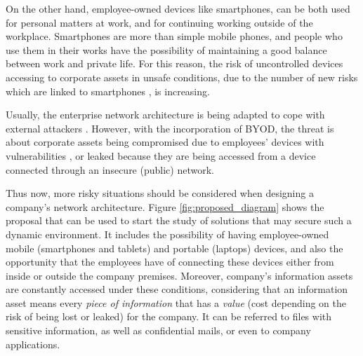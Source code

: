 On the other hand, employee-owned devices like smartphones, can be both used for personal matters at work, and for continuing working outside of the workplace. Smartphones are more than simple mobile phones, and people who use them in their works have the possibility of maintaining a good balance between work and private life. For this reason, the risk of uncontrolled devices accessing to corporate assets in unsafe conditions, due to the number of new risks which are linked to smartphones \cite{gangula2013survey}, is increasing.

Usually, the enterprise network architecture is being adapted to cope with external attackers \cite{MIT05}. However, with the incorporation of BYOD, the threat is about corporate assets being compromised due to employees' devices with vulnerabilities \cite{android11}, or leaked because they are being accessed from a device connected through an insecure (public) network.

Thus now, more risky situations should be considered when designing a company's network architecture. Figure \ref{fig:proposed_diagram} shows the proposal that can be used to start the study of solutions that may secure such a dynamic environment. It includes the possibility of having employee-owned mobile (smartphones and tablets) and portable (laptops) devices, and also the opportunity that the employees have of connecting these devices either from inside or outside the company premises. Moreover, company's information assets are constantly accessed under these conditions, considering that an information asset means every \textit{piece of information} that has a \textit{value} (cost depending on the risk of being lost or leaked) for the company. It can be referred to files with sensitive information, as well as confidential mails, or even to company applications.

